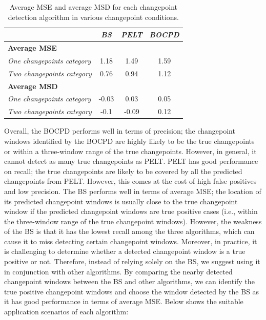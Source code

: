 \documentclass[]{interact}
\theoremstyle{plain}%
\theoremstyle{definition}
\theoremstyle{remark}
\begin{document}
{    \begin{table}[H]
    	\captionsetup{justification=raggedright}
    	\centering
    	\renewcommand{\arraystretch}{1.2} %
    	\small
    	\begin{tabular}{lccc}
    		\hline
    		& \textit{BS} & \textit{PELT} & \textit{BOCPD} \\ \hline
    		\textbf{Average MSE}               &             &               &                \\
    		\textit{One changepoints category} & 1.18        & 1.49          & 1.59           \\
    		\textit{Two changepoints category} & 0.76        & 0.94          & 1.12           \\
    		\textbf{Average MSD}               &             &               &                \\
    		\textit{One changepoints category} & -0.03       & 0.03          & 0.05           \\
    		\textit{Two changepoints category} & -0.1        & -0.09          & 0.12          \\ \hline
    	\end{tabular}
    	\caption{Average MSE and average MSD for each changepoint detection algorithm in various changepoint conditions.}
    	\label{Avg_MSEMSD}
    \end{table}

    Overall, the BOCPD performs well in terms of precision; the changepoint windows identified by the BOCPD are highly likely to be the true changepoints or within a three-window range of the true changepoints. However, in general, it cannot detect as many true changepoints as PELT. PELT has good performance on recall; the true changepoints are likely to be covered by all the predicted changepoints from PELT. However, this comes at the cost of high false positives and low precision. The BS performs well in terms of average MSE; the location of its predicted changepoint windows is usually close to the true changepoint window if the predicted changepoint windows are true positive cases (i.e., within the three-window range of the true changepoint windows). However, the weakness of the BS is that it has the lowest recall among the three algorithms, which can cause it to miss detecting certain changepoint windows. Moreover, in practice, it is challenging to determine whether a detected changepoint window is a true positive or not. Therefore, instead of relying solely on the BS, we suggest using it in conjunction with other algorithms. By comparing the nearby detected changepoint windows between the BS and other algorithms, we can identify the true positive changepoint windows and choose the window detected by the BS as it has good performance in terms of average MSE. Below shows the suitable application scenarios of each algorithm:
    
}
\end{document}

